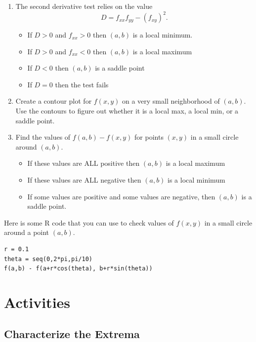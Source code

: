 \documentclass[
]{book}
\providecommand{\tightlist}{%
  \setlength{\itemsep}{0pt}\setlength{\parskip}{0pt}}
\begin{document}
\begin{enumerate}
\def\labelenumi{\arabic{enumi}.}
\item
  The second derivative test relies on the value
  \[
  D = f_{xx} f_{yy} - (f_{xy})^2.
  \]

  \begin{itemize}
  \tightlist
  \item
    If \(D > 0\) and \(f_{xx} > 0\) then \((a,b)\) is a local minimum.
  \item
    If \(D > 0\) and \(f_{xx} < 0\) then \((a,b)\) is a local maximum
  \item
    If \(D < 0\) then \((a,b)\) is a saddle point
  \item
    If \(D=0\) then the test fails
  \end{itemize}
\item
  Create a contour plot for \(f(x,y)\) on a very small neighborhood of \((a,b)\). Use the contours to figure out whether it is a local max, a local min, or a saddle point.
\item
  Find the values of \(f(a,b) - f(x,y)\) for points \((x,y)\) in a small circle around \((a,b)\).

  \begin{itemize}
  \tightlist
  \item
    If these values are ALL positive then \((a,b)\) is a local maximum
  \item
    If these values are ALL negative then \((a,b)\) is a local minimum
  \item
    If some values are positive and some values are negative, then \((a,b)\) is a saddle point.
  \end{itemize}
\end{enumerate}

Here is some R code that you can use to check values of \(f(x,y)\) in a small circle around a point \((a,b)\).

\begin{verbatim}
r = 0.1
theta = seq(0,2*pi,pi/10)
f(a,b) - f(a+r*cos(theta), b+r*sin(theta)) 
\end{verbatim}

\hypertarget{activities-18}{%
\section{Activities}\label{activities-18}}

\hypertarget{characterize-the-extrema-1}{%
\subsection{Characterize the Extrema}\label{characterize-the-extrema-1}}
\end{document}
